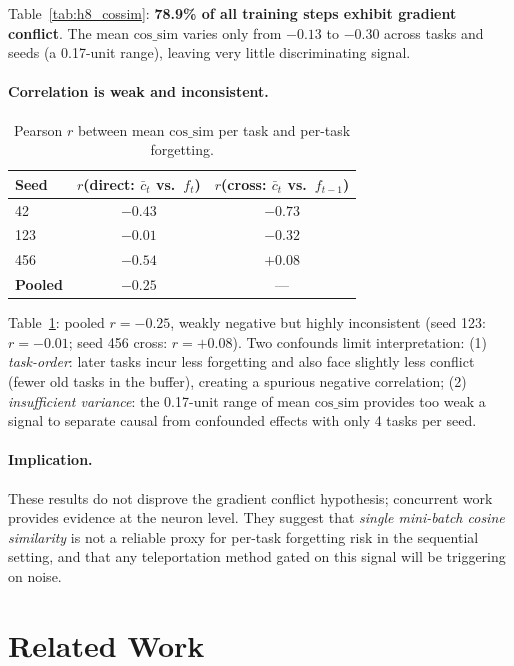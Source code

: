 \documentclass{article}
\newcommand{\cossim}{\mathrm{cos\_sim}}
\begin{document}
Table~\ref{tab:h8_cossim}: \textbf{78.9\% of all training steps exhibit gradient conflict}.
The mean $\cossim$ varies only from $-0.13$ to $-0.30$ across tasks and seeds (a 0.17-unit range),
leaving very little discriminating signal.

\paragraph{Correlation is weak and inconsistent.}

\begin{table}[h]
\centering
\caption{Pearson $r$ between mean $\cossim$ per task and per-task forgetting.}
\label{tab:h8_corr}
\begin{tabular}{lcc}
\toprule
Seed & $r$(direct: $\bar{c}_t$ vs.\ $f_t$) & $r$(cross: $\bar{c}_t$ vs.\ $f_{t-1}$) \\
\midrule
42  & $-0.43$ & $-0.73$ \\
123 & $-0.01$ & $-0.32$ \\
456 & $-0.54$ & $+0.08$ \\
\midrule
\textbf{Pooled} & $\mathbf{-0.25}$ & --- \\
\bottomrule
\end{tabular}
\end{table}

Table~\ref{tab:h8_corr}: pooled $r = -0.25$, weakly negative but highly inconsistent
(seed 123: $r = -0.01$; seed 456 cross: $r = +0.08$).
Two confounds limit interpretation:
(1) \emph{task-order}: later tasks incur less forgetting and also face slightly less conflict
    (fewer old tasks in the buffer), creating a spurious negative correlation;
(2) \emph{insufficient variance}: the 0.17-unit range of mean $\cossim$ provides too weak
    a signal to separate causal from confounded effects with only 4 tasks per seed.

\paragraph{Implication.}
These results do not disprove the gradient conflict hypothesis; concurrent work
\citep{liu2026gradconflict} provides evidence at the neuron level.
They suggest that \emph{single mini-batch cosine similarity} is not a reliable proxy
for per-task forgetting risk in the sequential setting, and that any teleportation
method gated on this signal will be triggering on noise.

\section{Related Work}
\label{sec:related}
\end{document}

